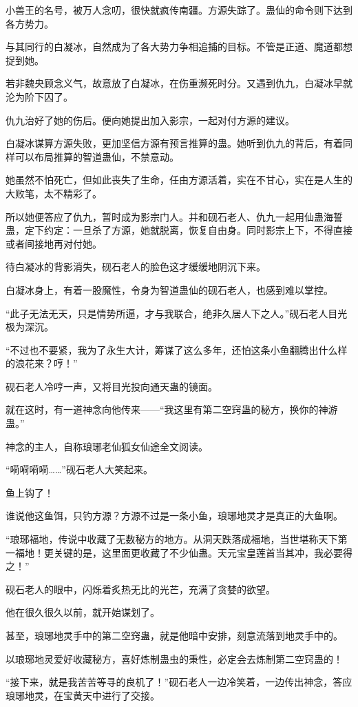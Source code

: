 \begin{this_body}
小兽王的名号，被万人念叨，很快就疯传南疆。方源失踪了。蛊仙的命令则下达到各方势力。

与其同行的白凝冰，自然成为了各大势力争相追捕的目标。不管是正道、魔道都想捉到她。

若非魏央顾念义气，故意放了白凝冰，在伤重濒死时分。又遇到仇九，白凝冰早就沦为阶下囚了。

仇九治好了她的伤后。便向她提出加入影宗，一起对付方源的建议。

白凝冰谋算方源失败，更加坚信方源有预言推算的蛊。她听到仇九的背后，有着同样可以布局推算的智道蛊仙，不禁意动。

她虽然不怕死亡，但如此丧失了生命，任由方源活着，实在不甘心，实在是人生的大败笔，太不精彩了。

所以她便答应了仇九，暂时成为影宗门人。并和砚石老人、仇九一起用仙蛊海誓蛊，定下约定：一旦杀了方源，她就脱离，恢复自由身。同时影宗上下，不得直接或者间接地再对付她。

待白凝冰的背影消失，砚石老人的脸色这才缓缓地阴沉下来。

白凝冰身上，有着一股魔性，令身为智道蛊仙的砚石老人，也感到难以掌控。

“此子无法无天，只是情势所逼，才与我联合，绝非久居人下之人。”砚石老人目光极为深沉。

“不过也不要紧，我为了永生大计，筹谋了这么多年，还怕这条小鱼翻腾出什么样的浪花来？哼！”

砚石老人冷哼一声，又将目光投向通天蛊的镜面。

就在这时，有一道神念向他传来——“我这里有第二空窍蛊的秘方，换你的神游蛊。”

神念的主人，自称琅琊老仙狐女仙途全文阅读。

“嗬嗬嗬嗬……”砚石老人大笑起来。

鱼上钩了！

谁说他这鱼饵，只钓方源？方源不过是一条小鱼，琅琊地灵才是真正的大鱼啊。

“琅琊福地，传说中收藏了无数秘方的地方。从洞天跌落成福地，当世堪称天下第一福地！更关键的是，这里面更收藏了不少仙蛊。天元宝皇莲首当其冲，我必要得之！”

砚石老人的眼中，闪烁着炙热无比的光芒，充满了贪婪的欲望。

他在很久很久以前，就开始谋划了。

甚至，琅琊地灵手中的第二空窍蛊，就是他暗中安排，刻意流落到地灵手中的。

以琅琊地灵爱好收藏秘方，喜好炼制蛊虫的秉性，必定会去炼制第二空窍蛊的！

“接下来，就是我苦苦等寻的良机了！”砚石老人一边冷笑着，一边传出神念，答应琅琊地灵，在宝黄天中进行了交接。


\end{this_body}
